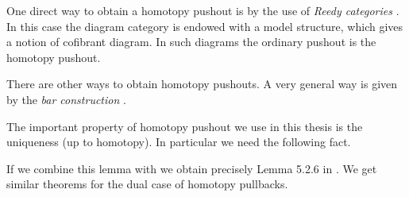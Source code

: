 One direct way to obtain a homotopy pushout is by the use of \emph{Reedy categories} \cite{hovey}. In this case the diagram category is endowed with a model structure, which gives a notion of cofibrant diagram. In such diagrams the ordinary pushout is the homotopy pushout.


There are other ways to obtain homotopy pushouts. A very general way is given by the \emph{bar construction} \cite{riehl}.

The important property of homotopy pushout we use in this thesis is the uniqueness (up to homotopy). In particular we need the following fact.


If we combine this lemma with  we obtain precisely Lemma 5.2.6 in \cite{hovey}. We get similar theorems for the dual case of homotopy pullbacks.
